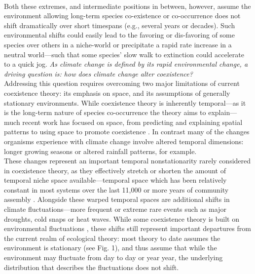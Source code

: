 \documentclass[12pt,a4paper,oneside]{article}
\begin{document}
\vspace{1.5ex}\\
Both these extremes, and intermediate positions in between, however, assume the environment allowing long-term species co-existence or co-occurrence does not shift dramatically over short timespans (e.g., several years or decades). Such environmental shifts could easily lead to the favoring or dis-favoring of some species over others in a niche-world or precipitate a rapid rate increase in a neutral world---such that some species' slow walk to extinction could accelerate to a quick jog. \emph{As climate change is defined by its rapid environmental change, a driving question is: how does climate change alter coexistence?}
\vspace{1.5ex}\\
Addressing this question requires overcoming two major limitations of current coexistence theory: its emphasis on space, and its assumptions of generally stationary environments. While coexistence theory is inherently temporal---as it is the long-term nature of species co-occurrence the theory aims to explain---much recent work has focused on space, from predicting and explaining spatial patterns  to using space to promote coexistence \citep{gilbert2004}. In contrast many of the changes organisms experience with climate change involve altered temporal dimensions: longer growing seasons or altered rainfall patterns, for example. 
\vspace{1.5ex}\\ 
These changes represent an important temporal nonstationarity rarely considered in coexistence theory, as they effectively stretch or shorten the amount of temporal niche space available---temporal space which has been relatively constant in most systems over the last 11,000 or more years of community assembly \citep{Trenberth:2007hk}. Alongside these warped temporal spaces are additional shifts in climate fluctuations---more frequent or extreme rare events such as major droughts, cold snaps or heat waves. While some coexistence theory is built on environmental fluctuations \citep{Chesson:1997dz}, these shifts still represent important departures from the current realm of ecological theory: most theory to date assumes the environment is stationary (see Fig. 1), and thus assume that while the environment may fluctuate from day to day or year year, the underlying distribution that describes the fluctuations does not shift. 
\end{document}

